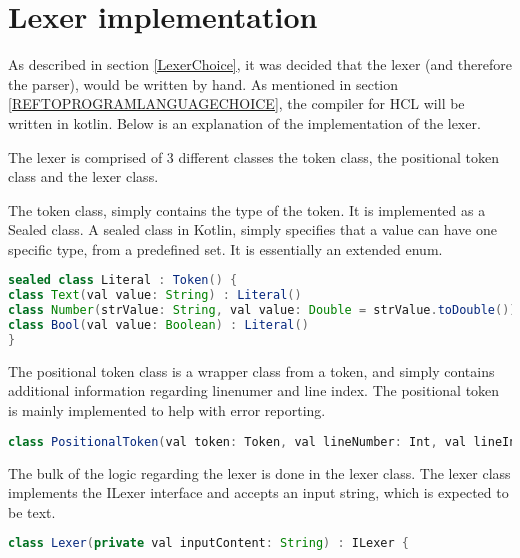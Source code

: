 \section{Lexer implementation}
As described in section \ref{LexerChoice}, it was decided that the lexer (and therefore the parser), would be written by hand.
As mentioned in section \ref{REFTOPROGRAMLANGUAGECHOICE}, the compiler for HCL will be written in kotlin.
Below is an explanation of the implementation of the lexer.

The lexer is comprised of 3 different classes the token class, the positional token class and the lexer class.

The token class, simply contains the type of the token. 
It is implemented as a Sealed class. 
A sealed class in Kotlin, simply specifies that a value can have one specific type, from a predefined set\cite{KotlinSealed}.
It is essentially an extended enum.
\begin{lstlisting}[language=java,label=lis:tokenClass,caption=A snippet from the token class .,firstnumber=9]
sealed class Literal : Token() {
class Text(val value: String) : Literal()
class Number(strValue: String, val value: Double = strValue.toDouble()) : Literal()
class Bool(val value: Boolean) : Literal()
}
\end{lstlisting}

The positional token class is a wrapper class from a token, and simply contains additional information regarding linenumer and line index.
The positional token is mainly implemented to help with error reporting.
\begin{lstlisting}[language=java,label=lis:PositionalTokenClass,caption=A snippet from the token class .,firstnumber=10]
class PositionalToken(val token: Token, val lineNumber: Int, val lineIndex: Int)
\end{lstlisting}

The bulk of the logic regarding the lexer is done in the lexer class.
The lexer class implements the ILexer interface and accepts an input string, which is expected to be text.

\begin{lstlisting}[language=java,label=lis:Lexer,caption=The Lexer .,firstnumber=8]
class Lexer(private val inputContent: String) : ILexer {
\end{lstlisting}

